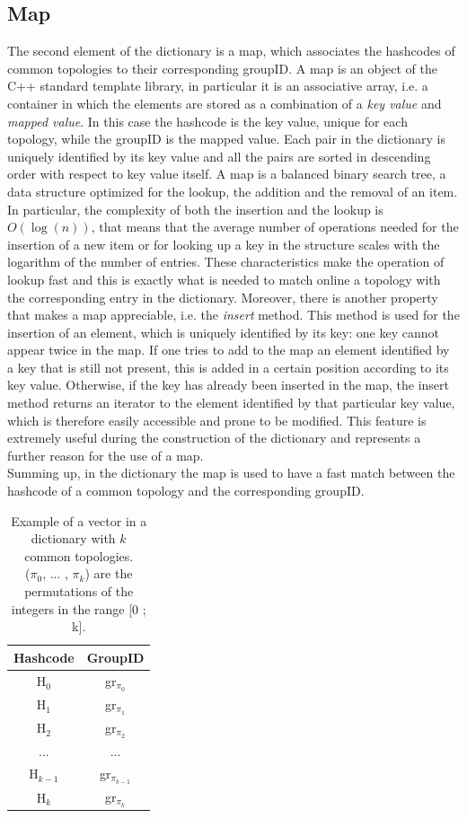 \subsection{Map}
\label{sec:map}
The second element of the dictionary is a map, which associates the hashcodes of common topologies to their corresponding groupID. A map is an object of the C++ standard template library, in particular it is an associative array, i.e. a container in which the elements are stored as a combination of a \textit{key value} and \textit{mapped value}\cite{map}. In this case the hashcode is the key value, unique for each topology, while the groupID is the mapped value. Each pair in the dictionary is uniquely identified by its key value and all the pairs are sorted in descending order with respect to key value itself. A map is a balanced binary search tree, a data structure optimized for the lookup, the addition and the removal of an item. In particular, the complexity of both the insertion and the lookup is $O(\log(n))$, that means that the average number of operations needed for the insertion of a new item or for looking up a key in the structure scales with the logarithm of the number of entries. These characteristics make the operation of lookup fast and this is exactly what is needed to match online a topology with the corresponding entry in the dictionary. Moreover, there is another property that makes a map appreciable, i.e. the \textit{insert} method. This method is used for the insertion of an element, which is uniquely identified by its key: one key cannot appear twice in the map. If one tries to add to the map an element identified by a key that is still not present, this is added in a certain position according to its key value. Otherwise, if the key has already been inserted in the map, the insert method returns an iterator to the element identified by that particular key value, which is therefore easily accessible and prone to be modified. This feature is extremely useful during the construction of the dictionary and represents a further reason for the use of a map.\\
Summing up, in the dictionary the map is used to have a fast match between the hashcode of a common topology and the corresponding groupID.
%
\begin{table}
\centering
\renewcommand\arraystretch{1.5}
 \begin{tabular}{|c|c|}
  \hline
  Hashcode & GroupID\\
  \hline
  H$_0$ & gr$_{\pi_{0}}$\\
  H$_1$ & gr$_{\pi_{1}}$\\
  H$_2$ & gr$_{\pi_{2}}$\\
  ... & ...\\
  H$_{k-1}$ & gr$_{\pi_{k-1}}$\\
  H$_k$ & gr$_{\pi_{k}}$\\
  \hline
 \end{tabular}
 \caption{Example of a vector in a dictionary with $k$ common topologies.\\ ($\pi_0$, ... , $\pi_k$) are the permutations of the integers in the range [0 ; k].}
 \label{tab:map}
\end{table}
%
